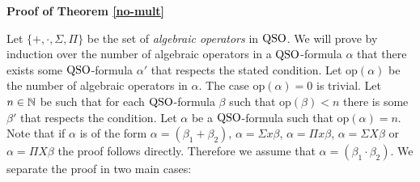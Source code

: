 
\textbf{Proof of Theorem \ref{no-mult}}

Let $\{+, \cdot, \Sigma, \Pi\}$ be the set of {\it algebraic operators} in ${\rm QSO}$. We will prove by induction over the number of algebraic operators in a ${\rm QSO}$-formula $\alpha$ that there exists some ${\rm QSO}$-formula $\alpha'$ that respects the stated condition. Let $\text{op}(\alpha)$ be the number of algebraic operators in $\alpha$. The case $\text{op}(\alpha) = 0$ is trivial. Let $n\in\mathbb{N}$ be such that for each ${\rm QSO}$-formula $\beta$ such that $\text{op}(\beta) < n$ there is some $\beta'$ that respects the condition. Let $\alpha$ be a ${\rm QSO}$-formula such that $\text{op}(\alpha) = n$. Note that if $\alpha$ is of the form $\alpha = (\beta_1 + \beta_2)$, $\alpha = \Sigma x \beta$, $\alpha = \Pi x \beta$, $\alpha = \Sigma X \beta$ or $\alpha = \Pi X \beta$ the proof follows directly. Therefore we assume that $\alpha = (\beta_1 \cdot \beta_2)$. We separate the proof in two main cases:
